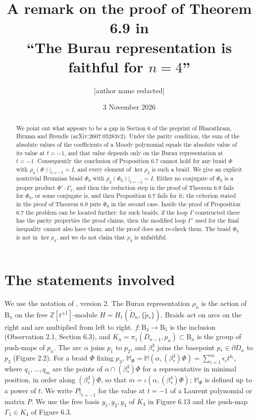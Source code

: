 \documentclass[11pt]{amsart}
\title[A remark on Section 6 of arXiv:2607.05283]{A remark on the proof of Theorem 6.9 in\\ ``The Burau representation is faithful for $n=4$''}
\author{[author name redacted]}
\date{3 November 2026}
\theoremstyle{remark}
\newcommand{\M}{\mathbb{M}}
\newcommand{\B}{\mathrm{B}}
\newcommand{\bs}{\beta^3_*}
\newcommand{\at}{\big|_{t=-1}}
\begin{document}
\begin{abstract}
We point out what appears to be a gap in Section 6 of the preprint \cite{BBB} of Bharathram, Birman and Brendle (arXiv:2607.05283v2). Under the parity condition, the sum of the absolute values of the coefficients of a Moody polynomial equals the absolute value of its value at $t=-1$, and that value depends only on the Burau representation at $t=-1$. Consequently the conclusion of Proposition 6.7 cannot hold for any braid $\Phi$ with $\rho_4(\Phi)\at=I$, and every element of $\ker\rho_4$ is such a braid. We give an explicit nontrivial Brunnian braid $\Phi_0$ with $\rho_4(\Phi_0)\at=I$. Either no conjugate of $\Phi_0$ is a proper product $\Phi'\cdot\Gamma_1$, and then the reduction step in the proof of Theorem 6.9 fails for $\Phi_0$, or some conjugate is, and then Proposition 6.7 fails for it; the criterion stated in the proof of Theorem 6.9 puts $\Phi_0$ in the second case. Inside the proof of Proposition 6.7 the problem can be located further: for such braids, if the loop $\Gamma$ constructed there has the parity properties the proof claims, then the modified loop $\Gamma'$ used for the final inequality cannot also have them, and the proof does not re-check them. The braid $\Phi_0$ is not in $\ker\rho_4$, and we do not claim that $\rho_4$ is unfaithful.
\end{abstract}

\maketitle

\section{The statements involved}

We use the notation of \cite{BBB}, version 2. The Burau representation $\rho_n$ is the action of $\B_n$ on the free $\mathbb{Z}[t^{\pm1}]$-module $H=H_1(\widetilde D_n,\{\tilde p_*\})$. Braids act on arcs on the right and are multiplied from left to right. $f\colon \B_4\to \B_5$ is the inclusion (Observation 2.1, Section 6.3), and $K_n=\pi_1(D_{n-1},p_n)\subset \B_n$ is the group of push-maps of $p_n$. The arc $\alpha$ joins $p_1$ to $p_2$, and $\bs$ joins the basepoint $p_*\in\partial D_n$ to $p_3$ (Figure 2.2). For a braid $\Phi$ fixing $p_3$, $\M_\Phi=\M(\alpha,(\bs)\Phi)=\sum_{i=1}^m\epsilon_i t^{k_i}$, where $q_1,\dots,q_m$ are the points of $\alpha\cap(\bs)\Phi$ for a representative in minimal position, in order along $(\bs)\Phi$, so that $m=\iota(\alpha,(\bs)\Phi)$; $\M_\Phi$ is defined up to a power of $t$. We write $P\at$ for the value at $t=-1$ of a Laurent polynomial or matrix $P$. We use the free basis $y_1,y_2,y_3$ of $K_4$ in Figure 6.13 and the push-map $\Gamma_1\in K_4$ of Figure 6.3.
\end{document}
